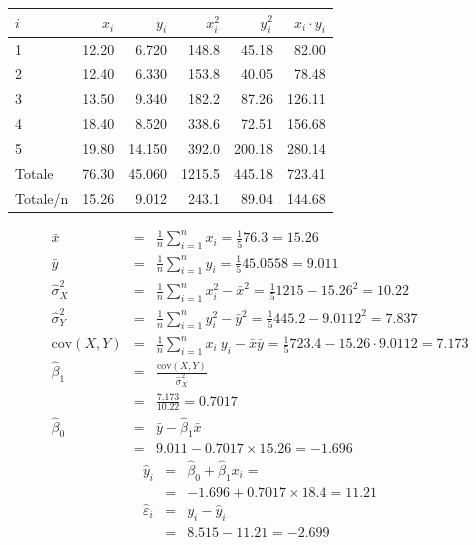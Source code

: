 \documentclass[
  11pt,
]{book}
\theoremstyle{mytheoremstyle}
\theoremstyle{mydefstyle}
\newenvironment{sol}
  {
  \begin{tcolorbox}[enhanced,breakable,arc=0.1mm,boxrule=1pt,colback=white,colframe=iblue,
  title=\bf \fontfamily{lmss}\selectfont \hspace{.5 cm} Soluzione,drop fuzzy shadow]

}{
\end{tcolorbox}
  }
\begin{document}
\begin{sol}

\begin{table}[H]
\centering
\begin{tabular}{lrrrrr}
\toprule
$i$ & $x_i$ & $y_i$ & $x_i^2$ & $y_i^2$ & $x_i\cdot y_i$\\
\midrule
1 & 12.20 & 6.720 & 148.8 & 45.18 & 82.00\\
2 & 12.40 & 6.330 & 153.8 & 40.05 & 78.48\\
3 & 13.50 & 9.340 & 182.2 & 87.26 & 126.11\\
4 & 18.40 & 8.520 & 338.6 & 72.51 & 156.68\\
5 & 19.80 & 14.150 & 392.0 & 200.18 & 280.14\\
Totale & 76.30 & 45.060 & 1215.5 & 445.18 & 723.41\\
Totale/n & 15.26 & 9.012 & 243.1 & 89.04 & 144.68\\
\bottomrule
\end{tabular}
\end{table}

\begin{eqnarray*}
           \bar x &=&\frac 1 n\sum_{i=1}^n x_i = \frac {1}{ 5 }  76.3 =  15.26 \\
           \bar y &=&\frac 1 n\sum_{i=1}^n y_i = \frac {1}{ 5 }  45.0558 =  9.011 \\
           \hat\sigma_X^2&=&\frac 1 n\sum_{i=1}^n x_i^2-\bar x^2=\frac {1}{ 5 }  1215  - 15.26 ^2= 10.22 \\
           \hat\sigma_Y^2&=&\frac 1 n\sum_{i=1}^n y_i^2-\bar y^2=\frac {1}{ 5 }  445.2  - 9.0112 ^2= 7.837 \\
           \text{cov}(X,Y)&=&\frac 1 n\sum_{i=1}^n x_i~y_i-\bar x\bar y=\frac {1}{ 5 }  723.4 - 15.26 \cdot 9.0112 = 7.173 \\
           \hat\beta_1 &=& \frac{\text{cov}(X,Y)}{\hat\sigma_X^2} \\
                    &=& \frac{ 7.173 }{ 10.22 }  =  0.7017 \\
           \hat\beta_0 &=& \bar y - \hat\beta_1 \bar x\\
                    &=&  9.011 - 0.7017 \times  15.26 = -1.696 
         \end{eqnarray*}\begin{eqnarray*}
\hat y_i &=&\hat\beta_0+\hat\beta_1 x_i=\\ 
&=& -1.696 + 0.7017 \times 18.4 = 11.21 \\ 
\hat \varepsilon_i &=& y_i-\hat y_i\\ 
&=& 8.515 - 11.21 = -2.699  
\end{eqnarray*}

\end{sol}
\end{document}
